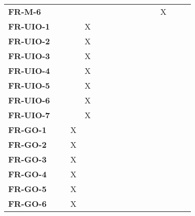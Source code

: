 \documentclass[12pt, titlepage]{article}
\begin{document}
\begin{table}[H]
\begin{adjustbox}{max width=0.7\paperwidth}
\begin{tabular}{l|ccccccccccc}
        \textbf{FR-M-6}    & ~ & ~ & ~ & ~ & ~ & ~ & ~ & ~ & X & ~\\
        \textbf{FR-UIO-1}  & ~ & ~ & X & ~ & ~ & ~ & ~ & ~ & ~ & ~\\
        \textbf{FR-UIO-2}  & ~ & ~ & X & ~ & ~ & ~ & ~ & ~ & ~ & ~\\
        \textbf{FR-UIO-3}  & ~ & ~ & X & ~ & ~ & ~ & ~ & ~ & ~ & ~\\
        \textbf{FR-UIO-4}  & ~ & ~ & X & ~ & ~ & ~ & ~ & ~ & ~ & ~\\
        \textbf{FR-UIO-5}  & ~ & ~ & X & ~ & ~ & ~ & ~ & ~ & ~ & ~\\
        \textbf{FR-UIO-6}  & ~ & ~ & X & ~ & ~ & ~ & ~ & ~ & ~ & ~\\
        \textbf{FR-UIO-7}  & ~ & ~ & X & ~ & ~ & ~ & ~ & ~ & ~ & ~\\
        \textbf{FR-GO-1}   & ~ & X & ~ & ~ & ~ & ~ & ~ & ~ & ~ & ~\\
        \textbf{FR-GO-2}   & ~ & X & ~ & ~ & ~ & ~ & ~ & ~ & ~ & ~\\
        \textbf{FR-GO-3}   & ~ & X & ~ & ~ & ~ & ~ & ~ & ~ & ~ & ~\\
        \textbf{FR-GO-4}   & ~ & X & ~ & ~ & ~ & ~ & ~ & ~ & ~ & ~\\
        \textbf{FR-GO-5}   & ~ & X & ~ & ~ & ~ & ~ & ~ & ~ & ~ & ~\\
        \textbf{FR-GO-6}   & ~ & X & ~ & ~ & ~ & ~ & ~ & ~ & ~ & ~\\
    \end{tabular}
    \end{adjustbox}
\end{table}
\end{document}
